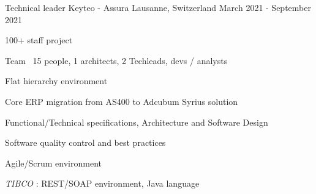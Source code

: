 \begin{cventries}
    \cventry
    {Technical leader} %
    {Keyteo - Assura} %
    {Lausanne, Switzerland} %
    {March 2021 - September 2021} %
    {
        \experience
        {
        \begin{cvitems} %
            \item{100+ staff project}
            \item{Team ~15 people, 1 architects, 2 Techleads, devs / analysts}
            \item{Flat hierarchy environment}
            \item{Core ERP migration from AS400 to Adcubum Syrius solution}
        \end{cvitems}
        }
        {
        \begin{cvitems} %
            \item{Functional/Technical specifications, Architecture and Software Design}
            \item{Software quality control and best practices}
            \item{Agile/Scrum environment}
        \end{cvitems}
        }
        {
        \begin{cvitems} %
            \item{\emph{TIBCO} : REST/SOAP environment, Java language}
        \end{cvitems}
        }
    }
    

\end{cventries}
